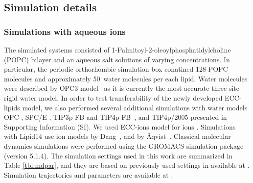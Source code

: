 \documentclass[aip,jcp,twocolumn]{revtex4}
\begin{document}
\subsection{Simulation details}

\subsubsection{Simulations with aqueous ions}
The simulated systems consisted of 1-Palmitoyl-2-oleoylphosphatidylcholine
(POPC) bilayer and an aqueous salt solutions of varying concentrations.
In particular, the periodic orthorhombic simulation box conatined 
128 POPC molecules and approximately 50~water molecules per each lipid.
Water molecules were described by OPC3 model~\cite{Izadi16} 
as it is currently the most accurate three site rigid water model. 
In order to test transferability of the newly developed ECC-lipids model, 
we also performed several additional simulations with water models 
OPC \cite{Izadi14}, SPC/E \cite{Berendsen1987}, TIP3p-FB and TIP4p-FB~\cite{Wang2014}, and TIP4p/2005 \cite{Abascal2005}
presented in Supporting Information (SI). 
We used ECC-ions model for ions \cite{jungwirth17-new-paper-to-be-published, kohagen16, Pluharova2014}.  %
Simulations with Lipid14 use ion models by Dang~\cite{smith94,chang1999,dang2006}, and by \AA{}qvist~\cite{aqvist90}. 
Classical molecular dynamics simulations were performed using the GROMACS \cite{Abraham15} simulation package (version 5.1.4).  
The simulation settings used in this work are 
summarized in Table \ref{tbl:mdpar}, 
and they are based on previously used settings in \cite{catte16} available at \cite{lipid14POPC0mMNaClfiles}. 
Simulation trajectories and parameters are available at \cite{??} . 
\end{document}
